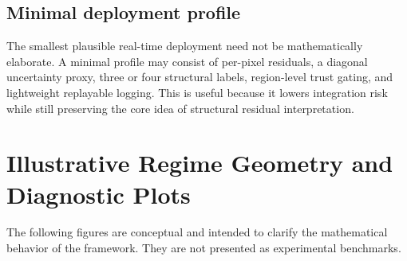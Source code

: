 \documentclass[11pt,letterpaper]{article}
\theoremstyle{gcresult}
\theoremstyle{definition}
\begin{document}
\subsection{Minimal deployment profile}
The smallest plausible real-time deployment need not be mathematically elaborate. A minimal profile may consist of per-pixel residuals, a diagonal uncertainty proxy, three or four structural labels, region-level trust gating, and lightweight replayable logging. This is useful because it lowers integration risk while still preserving the core idea of structural residual interpretation.

\section{Illustrative Regime Geometry and Diagnostic Plots}

The following figures are conceptual and intended to clarify the mathematical behavior of the framework. They are not presented as experimental benchmarks.
\end{document}
